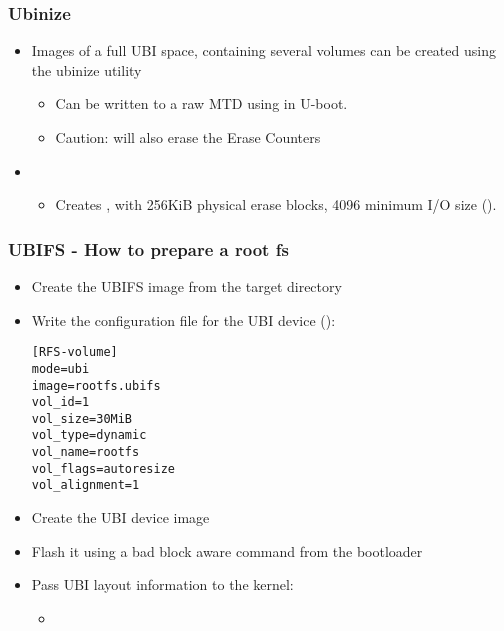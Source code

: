 \begin{frame}
  \frametitle{Ubinize}
  \begin{itemize}
  \item Images of a full UBI space, containing several volumes can be
    created using the ubinize utility
    \begin{itemize}
    \item Can be written to a raw MTD using  in U-boot.
    \item Caution:  will also erase the Erase
      Counters
    \end{itemize}
  \item {}
    \begin{itemize}
    \item Creates , with 256KiB physical erase blocks,
      4096 minimum I/O size ().
    \end{itemize}
  \end{itemize}
\end{frame}

\begin{frame}[fragile]
  \frametitle{UBIFS - How to prepare a root fs}
  \begin{itemize}
  \item Create the UBIFS image from the target directory
  \item Write the configuration file for the UBI device ():
\small
\begin{verbatim}
[RFS-volume]
mode=ubi
image=rootfs.ubifs
vol_id=1
vol_size=30MiB
vol_type=dynamic
vol_name=rootfs
vol_flags=autoresize
vol_alignment=1
\end{verbatim}
\normalsize
  \item Create the UBI device image
  \item Flash it using a bad block aware command from the bootloader
  \item Pass UBI layout information to the kernel:
    \begin{itemize}
    \item {}
    \end{itemize}
  \end{itemize}
\end{frame}

